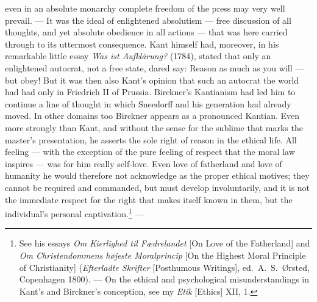 \documentclass[12pt,a4paper]{book}
\newcommand{\opage}[1]{\marginnote{\footnotesize\textit{[#1]}}}
\begin{document}
even in an absolute monarchy complete freedom of the press may very well prevail.
--- It was the ideal of enlightened absolutism --- free discussion of all thoughts,
and yet absolute obedience in all actions --- that was here carried through to its
uttermost consequence. Kant himself had, moreover, in his remarkable little essay
\emph{Was ist Aufklärung?} (1784), stated that only an enlightened autocrat, not a
free state, dared say: Reason as much as you will --- but obey! But it was then
also Kant's opinion that such an autocrat the world had had only in Friedrich II of
Prussia. Birckner's Kantianism had led him to continue a line of thought in which
Sneedorff and his generation had already \opage{29}moved. In other domains too Birckner
appears as a pronounced Kantian. Even more strongly than Kant, and without the
sense for the sublime that marks the master's presentation, he asserts the sole
right of reason in the ethical life. All feeling --- with the exception of the pure
feeling of respect that the moral law inspires --- was for him really self-love.
Even love of fatherland and love of humanity he would therefore not acknowledge as
the proper ethical motives; they cannot be required and commanded, but must develop
involuntarily, and it is not the immediate respect for the right that makes itself
known in them, but the individual's personal captivation.\footnote{See his essays
\emph{Om Kierlighed til Fædrelandet} [On Love of the Fatherland] and \emph{Om
Christendommens højeste Moralprincip} [On the Highest Moral Principle of
Christianity] (\emph{Efterladte Skrifter} [Posthumous Writings], ed.\ A.\ S.\
Ørsted, Copenhagen 1800). --- On the ethical and psychological misunderstandings in
Kant's and Birckner's conception, see my \emph{Etik} [Ethics] XII, 1.} ---
\end{document}
